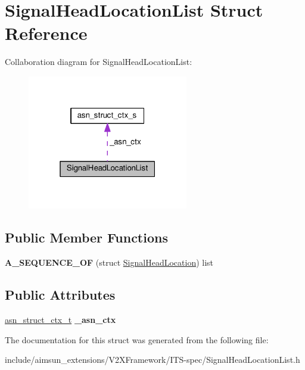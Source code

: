 \hypertarget{structSignalHeadLocationList}{}\section{Signal\+Head\+Location\+List Struct Reference}
\label{structSignalHeadLocationList}


Collaboration diagram for Signal\+Head\+Location\+List\+:\nopagebreak
\begin{figure}[H]
\begin{center}
\leavevmode
\includegraphics[width=199pt]{structSignalHeadLocationList__coll__graph}
\end{center}
\end{figure}
\subsection*{Public Member Functions}
\begin{DoxyCompactItemize}
\item 
{\bfseries A\+\_\+\+S\+E\+Q\+U\+E\+N\+C\+E\+\_\+\+OF} (struct \hyperlink{structSignalHeadLocation}{Signal\+Head\+Location}) list\hypertarget{structSignalHeadLocationList_a10377f5ec00662d7b60331d5ac977d3a}{}\label{structSignalHeadLocationList_a10377f5ec00662d7b60331d5ac977d3a}

\end{DoxyCompactItemize}
\subsection*{Public Attributes}
\begin{DoxyCompactItemize}
\item 
\hyperlink{structasn__struct__ctx__s}{asn\+\_\+struct\+\_\+ctx\+\_\+t} {\bfseries \+\_\+asn\+\_\+ctx}\hypertarget{structSignalHeadLocationList_acebf784d2d2734bf42c2a6179d0a39e0}{}\label{structSignalHeadLocationList_acebf784d2d2734bf42c2a6179d0a39e0}

\end{DoxyCompactItemize}


The documentation for this struct was generated from the following file\+:\begin{DoxyCompactItemize}
\item 
include/aimsun\+\_\+extensions/\+V2\+X\+Framework/\+I\+T\+S-\/spec/Signal\+Head\+Location\+List.\+h\end{DoxyCompactItemize}
